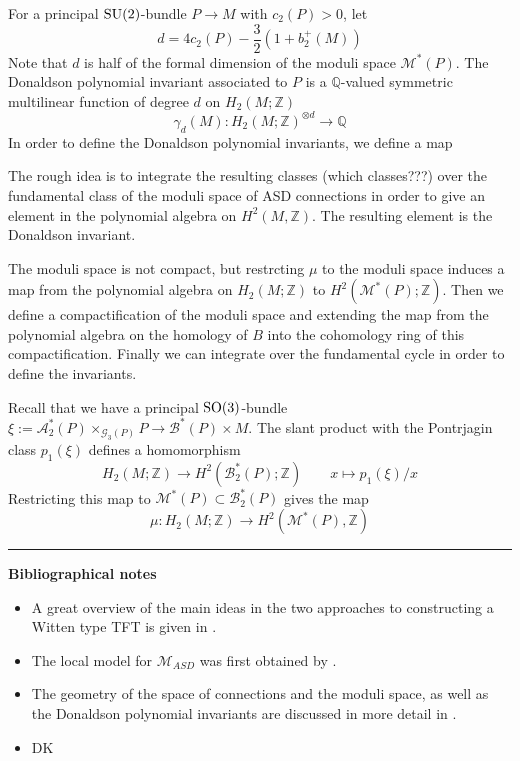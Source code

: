 For a principal $\operatorname{SU}(2)$-bundle  $P\to M$ with  $c_2(P) > 0$, let 
\[
d = 4c_2(P) - \frac{3}{2}(1+b_2^+(M))
\] 
Note that $d$ is half of the formal dimension of the moduli space
$\mathcal{M}^*(P)$. The Donaldson polynomial invariant associated to $P$ is a
$\mathbb{Q}$-valued symmetric multilinear function of degree  $d$ on  
$H_2(M;\mathbb{Z})$ 
\[
\gamma_d(M) : H_2(M;\mathbb{Z})^{\otimes d} \to \mathbb{Q}
\] 
In order to define the Donaldson polynomial invariants, we define a map 

The rough idea is to integrate the resulting classes (which classes???) over the
fundamental class of the moduli space of ASD connections in order to give an
element in the polynomial algebra on  $H^2(M,\mathbb{Z})$. The resulting element
is the Donaldson invariant. 

The moduli space is not compact, but restrcting $\mu$ to the moduli space
induces a map from the polynomial algebra on  $H_2(M;\mathbb{Z})$ to
$H^2(\mathcal{M}^*(P);\mathbb{Z})$. Then we define a compactification of the
moduli space and extending the map from the polynomial algebra on the homology
of $B$ into the cohomology ring of this compactification. Finally we can
integrate over the fundamental cycle in order to define the invariants.


Recall that we have a principal $\operatorname{SO}(3)$-bundle  $\xi:=\mathcal{A}_2^*(P)\times
_{\mathcal{G}_3(P)} P \to \mathcal{B}^*(P) \times M$. 
The slant product with the Pontrjagin class $p_1(\xi)$ defines a homomorphism 
\[
H_2(M;\mathbb{Z}) \to H^2(\mathcal{B}_2^*(P);\mathbb{Z})
\qquad x\mapsto p_1(\xi)/ x
\] 
Restricting this map to $\mathcal{M}^*(P) \subset \mathcal{B}_2^*(P)$ gives the
map 
\[
\mu : H_2(M;\mathbb{Z}) \to H^2(\mathcal{M}^*(P),\mathbb{Z})
\]


\vspace{5mm}
\hrule 
\vspace{5mm}



\textbf{Bibliographical notes}
{\small
\begin{itemize}
	\item A great overview of the main ideas in the two approaches to
		constructing a Witten type TFT is given in \citet{TQFTbook}.
	\item The local model for $\mathcal{M}_{ASD}$ was first obtained by 
		\citet{local_moduli}.
	\item The geometry of the space of connections and the moduli space, 
		as well as the Donaldson polynomial invariants are
		discussed in more detail in \citet{morgan}. 
	\item DK
\end{itemize}
}
